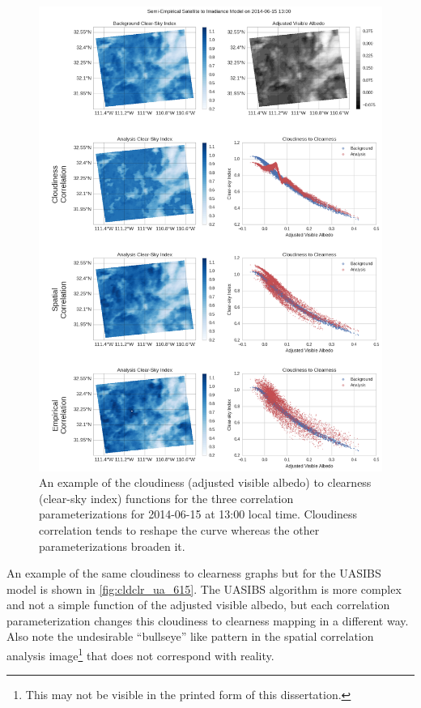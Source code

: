 \begin{figure}[p]
\centering
\includegraphics[width=.9\textwidth]{figs/cld_to_clear_Semi-Empirical_2014-06-15.png}
\caption[Clearness versus Cloudiness for SE model on 6/15]{An example
  of the cloudiness (adjusted visible albedo) to clearness (clear-sky
  index) functions for the three correlation parameterizations for
  2014-06-15 at 13:00 local time. Cloudiness correlation tends to
  reshape the curve whereas the other parameterizations broaden it.}
\label{fig:cldclr_se_615}
\end{figure}

An example of the same cloudiness to clearness graphs but for the
UASIBS model is shown in \cref{fig:cldclr_ua_615}.
The UASIBS algorithm is more complex and not a simple function
of the adjusted visible albedo, but each correlation parameterization
changes this cloudiness to clearness mapping in a different way.
Also note the undesirable ``bullseye'' like pattern in the spatial
correlation analysis image\footnote{This may not be visible in the
  printed form of this dissertation.} that does not correspond with
reality.

